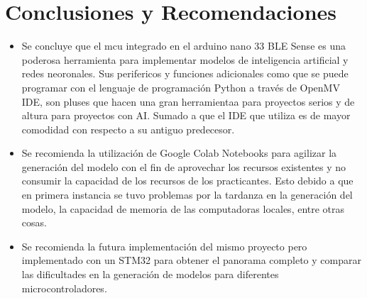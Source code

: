\section{Conclusiones y Recomendaciones}
\begin{itemize}

\item  Se concluye que el mcu integrado en el arduino nano 33 BLE Sense es una poderosa herramienta para implementar modelos de inteligencia artificial y redes neoronales. Sus perifericos y funciones adicionales como que se puede programar con el lenguaje de programación Python a través de OpenMV IDE, son pluses que hacen una gran herramientaa para proyectos serios y de altura para proyectos con AI. Sumado a que el IDE que utiliza es de mayor comodidad con respecto a su antiguo predecesor.
\item Se recomienda la utilización de Google Colab Notebooks para agilizar la generación del modelo con el fin de aprovechar los recursos existentes y no consumir la capacidad de los recursos de los practicantes. Esto debido a que en primera instancia se tuvo problemas por la tardanza en la generación del modelo, la capacidad de memoria de las computadoras locales, entre otras cosas.
\item Se recomienda la futura implementación del mismo proyecto pero implementado con un STM32 para obtener el panorama completo y comparar las dificultades en la generación de modelos para diferentes microcontroladores.
\end{itemize}